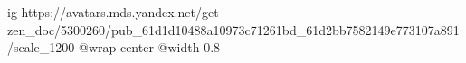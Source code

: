  
 
 
 
 

\ifcmt
  ig https://avatars.mds.yandex.net/get-zen_doc/5300260/pub_61d1d10488a10973c71261bd_61d2bb7582149e773107a891/scale_1200
	@wrap center
	@width 0.8
\fi
